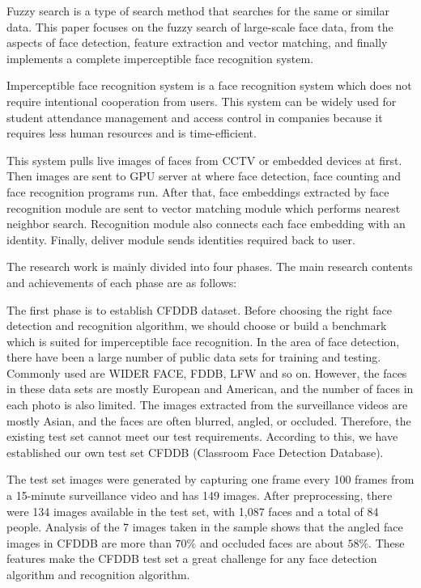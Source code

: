 \begin{bigabstract}
	
Fuzzy search is a type of search method that searches for the same or similar data. This paper focuses on the fuzzy search of large-scale face data, from the aspects of face detection, feature extraction and vector matching, and finally implements a complete imperceptible face recognition system.

Imperceptible face recognition system is a face recognition system which does not require intentional cooperation from users. This system can be widely used for student attendance management and access control in companies because it requires less human resources and is time-efficient. 

This system pulls live images of faces from CCTV or embedded devices at first. Then images are sent to GPU server at where face detection, face counting and face recognition programs run. After that, face embeddings extracted by face recognition module are sent to vector matching module which performs nearest neighbor search. Recognition module also connects each face embedding with an identity. Finally, deliver module sends identities required back to user.

The research work is mainly divided into four phases. The main research contents and achievements of each phase are as follows:

The first phase is to establish CFDDB dataset. Before choosing the right face detection and recognition algorithm, we should choose or build a benchmark which is suited for imperceptible face recognition. In the area of face detection, there have been a large number of public data sets for training and testing. Commonly used are WIDER FACE\cite{yang2016wider}, FDDB\cite{fddbTech}, LFW\cite{huang2007labeled} and so on. However, the faces in these data sets are mostly European and American, and the number of faces in each photo is also limited. The images extracted from the surveillance videos are mostly Asian, and the faces are often blurred, angled, or occluded. Therefore, the existing test set cannot meet our test requirements. According to this, we have established our own test set CFDDB (Classroom Face Detection Database).

The test set images were generated by capturing one frame every 100 frames from a 15-minute surveillance video and has 149 images. After preprocessing, there were 134 images available in the test set, with 1,087 faces and a total of 84 people. Analysis of the 7 images taken in the sample shows that the angled face images in CFDDB are more than $70\%$ and occluded faces are about $58\%$. These features make the CFDDB test set a great challenge for any face detection algorithm and recognition algorithm.


\end{bigabstract}

